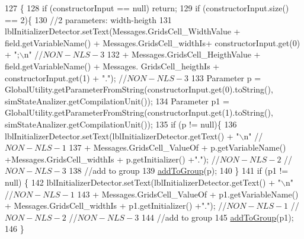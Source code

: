 \begin{DoxyCode}
127                                                                                                            
                 \{
128         \textcolor{keywordflow}{if} (constructorInput == null)   \textcolor{keywordflow}{return};
129         \textcolor{keywordflow}{if} (constructorInput.size() == 2)\{
130             \textcolor{comment}{//2 parameters: width-heigth}
131             lblInitializerDetector.setText(Messages.GridsCell\_WidthValue + field.getVariableName() + 
      Messages.GridsCell\_widthIs+ constructorInput.get(0) + \textcolor{stringliteral}{";\(\backslash\)n"} \textcolor{comment}{//$NON-NLS-3$}
132                                     + Messages.GridsCell\_HeigthValue + field.getVariableName() + Messages.
      GridsCell\_heigthIs + constructorInput.get(1) + \textcolor{stringliteral}{"."}); \textcolor{comment}{//$NON-NLS-3$}
133             Parameter p = GlobalUtility.getParameterFromString(constructorInput.get(0).toString(), 
      simStateAnalizer.getCompilationUnit());
134             Parameter p1 = GlobalUtility.getParameterFromString(constructorInput.get(1).toString(), 
      simStateAnalizer.getCompilationUnit());
135             \textcolor{keywordflow}{if} (p != null)\{ 
136                 lblInitializerDetector.setText(lblInitializerDetector.getText() + \textcolor{stringliteral}{"\(\backslash\)n"} \textcolor{comment}{//$NON-NLS-1$}
137                     + Messages.GridsCell\_ValueOf + p.getVariableName() +Messages.GridsCell\_widthIs  + 
      p.getInitializer() +\textcolor{stringliteral}{"."}); \textcolor{comment}{//$NON-NLS-2$ //$NON-NLS-3$}
138                 \textcolor{comment}{//add to group}
139                 \hyperlink{classit_1_1isislab_1_1masonassisteddocumentation_1_1mason_1_1wizards_1_1_g___grids_cell_page_a874d5aab262342b54eb0bd9ea0e576ab}{addToGroup}(p);
140             \}
141             \textcolor{keywordflow}{if} (p1 != null) \{
142                 lblInitializerDetector.setText(lblInitializerDetector.getText() + \textcolor{stringliteral}{"\(\backslash\)n"} \textcolor{comment}{//$NON-NLS-1$}
143                     +  Messages.GridsCell\_ValueOf + p1.getVariableName() + Messages.GridsCell\_widthIs + 
      p1.getInitializer() +\textcolor{stringliteral}{"."}); \textcolor{comment}{//$NON-NLS-1$ //$NON-NLS-2$ //$NON-NLS-3$}
144                 \textcolor{comment}{//add to group}
145                 \hyperlink{classit_1_1isislab_1_1masonassisteddocumentation_1_1mason_1_1wizards_1_1_g___grids_cell_page_a874d5aab262342b54eb0bd9ea0e576ab}{addToGroup}(p1);
146             \}

\end{DoxyCode}

